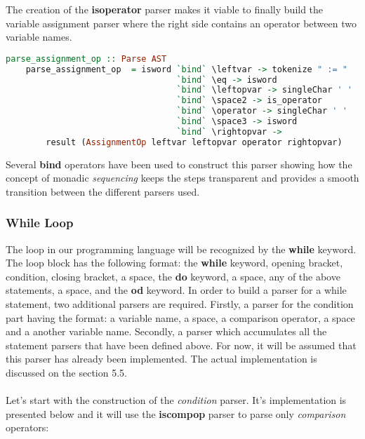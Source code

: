 \documentclass[a4paper, onecolumn]{article}
\begin{document}
    \noindent The creation of the \textbf{is\textunderscore operator} parser makes it viable to finally build the variable assignment parser where the right side contains an operator between two variable names. 
    
    \begin{tcolorbox}
    \begin{lstlisting}[language=Haskell] 
    parse_assignment_op :: Parse AST
    parse_assignment_op  = isword `bind` \leftvar -> tokenize " := " 
                                  `bind` \eq -> isword 
                                  `bind` \leftopvar -> singleChar ' ' 
                                  `bind` \space2 -> is_operator 
                                  `bind` \operator -> singleChar ' ' 
                                  `bind` \space3 -> isword 
                                  `bind` \rightopvar -> 
        result (AssignmentOp leftvar leftopvar operator rightopvar)
    \end{lstlisting}
    \end{tcolorbox}
    
    \noindent Several \textbf{bind} operators have been used to construct this parser showing how the concept of monadic \textit{sequencing} keeps the steps transparent and provides a smooth transition between the different parsers used. 
    
    \subsubsection{While Loop}
    
    The loop in our programming language will be recognized by the \textbf{while} keyword. The loop block has the following format: the \textbf{while} keyword, opening bracket, condition, closing bracket, a space, the \textbf{do} keyword, a space, any of the above statements, a space, and the \textbf{od} keyword. In order to build a parser for a while statement, two additional parsers are required. Firstly, a parser for the condition part having the format: a variable name, a space, a comparison operator, a space and a another variable name. Secondly, a parser which accumulates all the statement parsers that have been defined above. For now, it will be assumed that this parser has already been implemented. The actual implementation is discussed on the section 5.5. \\ \\
    \noindent Let's start with the construction of the \textit{condition} parser. It's implementation is presented below and it will use the \textbf{is\textunderscore comp\textunderscore op} parser to parse only \textit{comparison} operators: 
    
\end{document}
